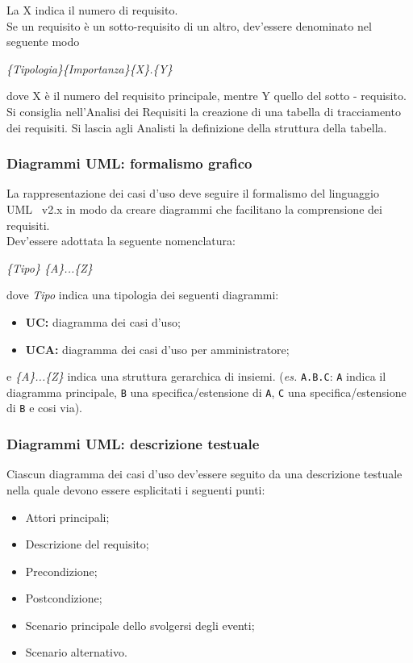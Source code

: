 {{{		La X indica il numero di requisito.\\
		Se un requisito è un sotto-requisito di un altro, dev'essere denominato nel seguente modo
		\begin{center}
			\textit{\{Tipologia\}\{Importanza\}\{X\}.\{Y\}}
		\end{center}
		dove X è il numero del requisito principale, mentre Y quello del sotto - requisito.
Si consiglia nell'Analisi dei Requisiti la creazione di una tabella di tracciamento dei requisiti. Si lascia agli Analisti la definizione della struttura della tabella.
}%

\subsubsection{Diagrammi UML: formalismo grafico}{
La rappresentazione dei casi d'uso deve seguire il formalismo del linguaggio UML\g~ v2.x in modo da creare diagrammi che facilitano la comprensione dei requisiti.\\
Dev'essere adottata la seguente nomenclatura:
\begin{center}
	\textit{\{Tipo\} \{A\}...\{Z\}}
\end{center}dove \textit{Tipo} indica una tipologia dei seguenti diagrammi:
\begin{itemize}
	\item [] \textbf{UC:} diagramma dei casi d’uso;
	\item [] \textbf{UCA:} diagramma dei casi d’uso per amministratore;
\end{itemize}
e \textit{\{A\}...\{Z\}} indica una struttura gerarchica di insiemi. (\textit{es.} \texttt{A.B.C}: \texttt{A} indica il diagramma principale, \texttt{B} una specifica/estensione di \texttt{A}, \texttt{C} una specifica/estensione di \texttt{B} e cosi via).
}%

\subsubsection{Diagrammi UML: descrizione testuale}{
Ciascun diagramma dei casi d'uso dev'essere seguito da una descrizione testuale nella quale devono essere esplicitati i seguenti punti:
\begin{itemize}
	\item Attori principali;
	\item Descrizione del requisito;
	\item Precondizione;
	\item Postcondizione;
	\item Scenario principale dello svolgersi degli eventi;
	\item Scenario alternativo.
\end{itemize}
}%

}}
